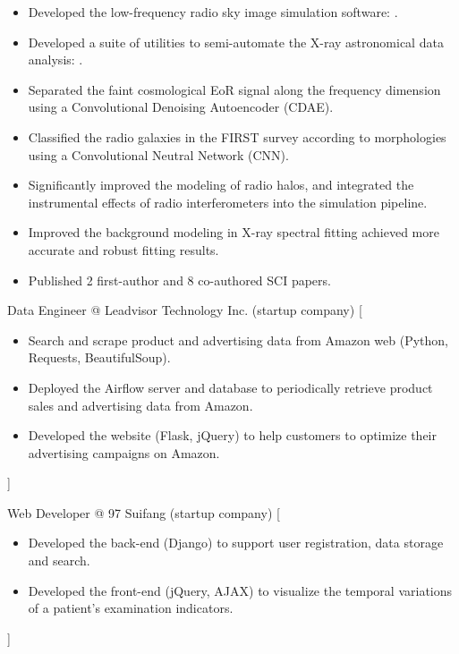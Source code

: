 \documentclass{resume}
\begin{document}
\begin{itemize}
  \item Developed the low-frequency radio sky image simulation software:
    .
  \item Developed a suite of utilities to semi-automate the
    X-ray astronomical data analysis:
    .
  \item Separated the faint cosmological EoR signal along the frequency
    dimension using a Convolutional Denoising Autoencoder (CDAE).
  \item Classified the radio galaxies in the FIRST survey according to
    morphologies using a Convolutional Neutral Network (CNN).
  \item Significantly improved the modeling of radio halos,
    and integrated the instrumental effects of radio interferometers
    into the simulation pipeline.
  \item Improved the background modeling in X-ray spectral fitting
    achieved more accurate and robust fitting results.
  \item Published 2 first-author and 8 co-authored SCI papers.
\end{itemize}

\begin{experiences}
    {Data Engineer @ Leadvisor Technology Inc. (startup company)}%
    [\begin{itemize}
      \item Search and scrape product and advertising data from Amazon web
        (Python, Requests, BeautifulSoup).
      \item Deployed the Airflow server and database to periodically
        retrieve product sales and advertising data from Amazon.
      \item Developed the website (Flask, jQuery) to help customers to
        optimize their advertising campaigns on Amazon.
    \end{itemize}]

  \separator{0.5ex}
    {Web Developer @ 97 Suifang (startup company)}%
    [\begin{itemize}
      \item Developed the back-end (Django) to support user registration,
        data storage and search.
      \item Developed the front-end (jQuery, AJAX) to visualize the
        temporal variations of a patient's examination indicators.
    \end{itemize}]
\end{experiences}
\end{document}
